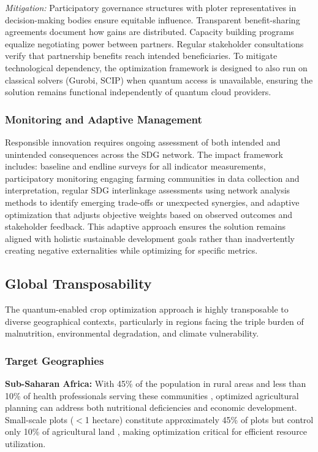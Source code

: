 \documentclass{oqireport}
\begin{document}
\textit{Mitigation:} Participatory governance structures with ploter representatives in decision-making bodies ensure equitable influence. Transparent benefit-sharing agreements document how gains are distributed. Capacity building programs equalize negotiating power between partners. Regular stakeholder consultations verify that partnership benefits reach intended beneficiaries. To mitigate technological dependency, the optimization framework is designed to also run on classical solvers (Gurobi, SCIP) when quantum access is unavailable, ensuring the solution remains functional independently of quantum cloud providers.

\subsubsection{Monitoring and Adaptive Management}

Responsible innovation requires ongoing assessment of both intended and unintended consequences across the SDG network. The impact framework includes: baseline and endline surveys for all indicator measurements, participatory monitoring engaging farming communities in data collection and interpretation, regular SDG interlinkage assessments using network analysis methods \cite{Fanzo2022} to identify emerging trade-offs or unexpected synergies, and adaptive optimization that adjusts objective weights based on observed outcomes and stakeholder feedback. This adaptive approach ensures the solution remains aligned with holistic sustainable development goals rather than inadvertently creating negative externalities while optimizing for specific metrics.

\subsection{Global Transposability}

The quantum-enabled crop optimization approach is highly transposable to diverse geographical contexts, particularly in regions facing the triple burden of malnutrition, environmental degradation, and climate vulnerability.

\subsubsection{Target Geographies}

\textbf{Sub-Saharan Africa:} With 45\% of the population in rural areas and less than 10\% of health professionals serving these communities \cite{Fanzo2022}, optimized agricultural planning can address both nutritional deficiencies and economic development. Small-scale plots ($<$1 hectare) constitute approximately 45\% of plots but control only 10\% of agricultural land \cite{LOWDER201616}, making optimization critical for efficient resource utilization.
\end{document}
